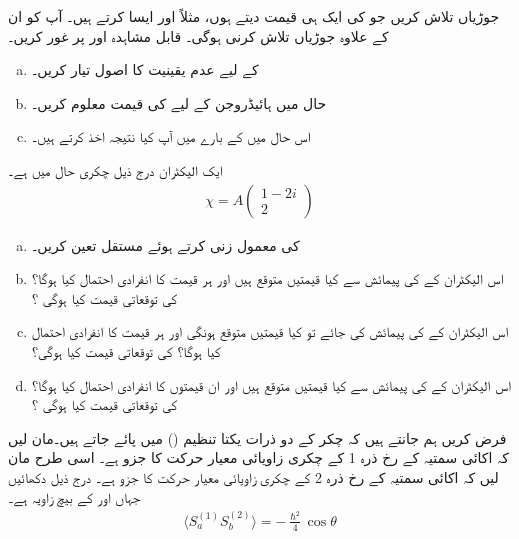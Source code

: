  جوڑیاں  تلاش کریں جو  کی ایک ہی قیمت دیتے ہوں، مثلاً  اور  ایسا کرتے ہیں۔ آپ کو ان کے علاوہ جوڑیاں تلاش کرنی ہوگی۔
قابل مشاہدہ  اور  پر غور کریں۔
\begin{enumerate}[a.]
\item
{} کے لیے عدم یقینیت کا اصول تیار کریں۔
\item
حال  میں ہائیڈروجن کے لیے  کی قیمت معلوم کریں۔
\item
اس حال میں  کے بارے میں آپ کیا نتیجہ اخذ کرتے ہیں۔
\end{enumerate}
ایک الیکٹران درج ذیل چکری حال میں ہے۔
\begin{align*}
\chi = A
\begin{pmatrix}
1 - 2i \\
2
\end{pmatrix}
\end{align*}
\begin{enumerate}[a.]
\item
{} کی معمول زنی کرتے ہوئے مستقل  تعین کریں۔
\item
اس الیکٹران کے  کی پیمائش سے کیا قیمتیں متوقع ہیں اور ہر قیمت کا انفرادی احتمال کیا ہوگا؟  کی توقعاتی قیمت کیا ہوگی ؟
\item
 اس الیکٹران کے  کی پیمائش کی جائے تو کیا قیمتیں متوقع ہونگی اور ہر قیمت کا انفرادی احتمال کیا ہوگا؟  کی توقعاتی قیمت کیا ہوگی؟ 
\item
اس الیکٹران کے  کی پیمائش سے کیا قیمتیں متوقع ہیں اور ان قیمتوں کا انفرادی احتمال کیا ہوگا؟  کی توقعاتی قیمت کیا ہوگی ؟
\end{enumerate}
 
فرض کریں ہم جانتے ہیں کہ  چکر کے دو ذرات یکتا تنظیم () میں پائے جاتے ہیں۔مان لیں کہ اکائی سمتیہ  کے رخ ذرہ 1 کے چکری زاویائی معیار حرکت کا جزو ہے۔ اسی طرح مان لیں کہ اکائی سمتیہ  کے رخ ذرہ 2 کے چکری زاویائی معیار حرکت کا جزو  ہے۔ درج ذیل دکھائیں جہاں  اور  کے بیچ زاویہ  ہے۔
\begin{align}
 \langle S_{a}^{(1)}S_{b}^{(2)}\rangle=-\frac{\hslash^{2}}{4}\cos\theta
\end{align}
